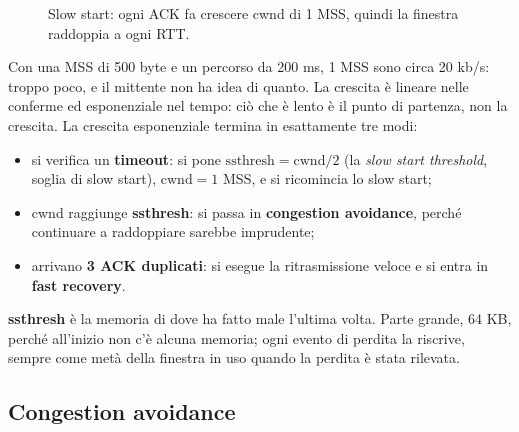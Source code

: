 \begin{figure}[H]
\centering
{}
\caption{Slow start: ogni ACK fa crescere cwnd di 1 MSS, quindi la finestra raddoppia a ogni RTT.}
\end{figure}

Con una MSS di 500 byte e un percorso da 200 ms, 1 MSS sono circa 20 kb/s: troppo poco, e il mittente non ha idea di
quanto. La crescita è lineare nelle conferme ed esponenziale nel tempo: ciò che è lento è il punto di partenza, non la
crescita. La crescita esponenziale termina in esattamente tre modi:

\begin{itemize}
    \item si verifica un \textbf{timeout}: si pone $\text{ssthresh} = \text{cwnd}/2$ (la \emph{slow start threshold},
          soglia di slow start), $\text{cwnd} = 1$ MSS, e si ricomincia lo slow start;
    \item cwnd raggiunge \textbf{ssthresh}: si passa in \textbf{congestion avoidance}, perché continuare a raddoppiare
          sarebbe imprudente;
    \item arrivano \textbf{3 ACK duplicati}: si esegue la ritrasmissione veloce e si entra in \textbf{fast recovery}.
\end{itemize}

\textbf{ssthresh} è la memoria di dove ha fatto male l'ultima volta. Parte grande, 64 KB, perché all'inizio non c'è
alcuna memoria; ogni evento di perdita la riscrive, sempre come metà della finestra in uso quando la perdita è stata
rilevata.

\subsection{Congestion avoidance}

